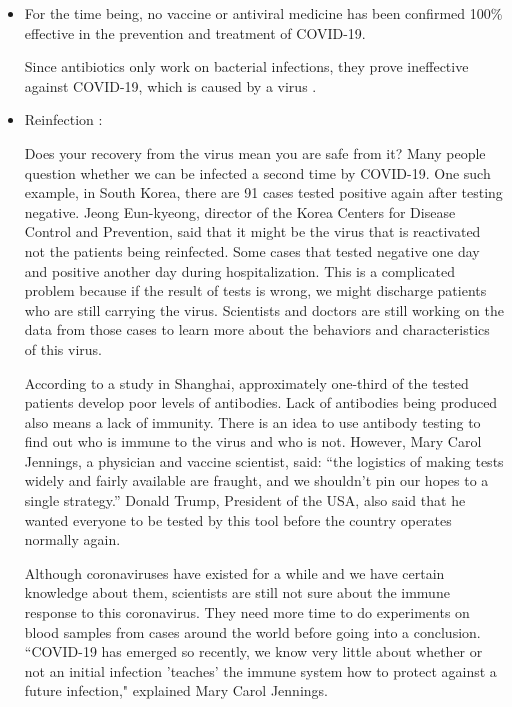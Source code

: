 \begin{itemize}
      \item For the time being, no vaccine or antiviral medicine has been confirmed 100\% effective in the prevention and treatment of COVID-19.
      \par Since antibiotics only work on bacterial infections, they prove ineffective against COVID-19, which is caused by a virus \parencite{Q&A_WHO}.
      \item Reinfection \parencite{Reinfection_abcnews} \parencite{Reinfection_independent}:
      \par Does your recovery from the virus mean you are safe from it? Many people question whether we can be infected a second time by COVID-19. One such example, in South Korea, there are 91 cases tested positive again after testing negative. Jeong Eun-kyeong, director of the Korea Centers for Disease Control and Prevention, said that it might be the virus that is reactivated not the patients being reinfected. Some cases that tested negative one day and positive another day during hospitalization. This is a complicated problem because if the result of tests is wrong, we might discharge patients who are still carrying the virus. Scientists and doctors are still working on the data from those cases to learn more about the behaviors and characteristics of this virus.
      \par According to a study in Shanghai, approximately one-third of the tested patients develop poor levels of antibodies. Lack of antibodies being produced also means a lack of immunity. There is an idea to use antibody testing to find out who is immune to the virus and who is not. However, Mary Carol Jennings, a physician and vaccine scientist, said: “the logistics of making tests widely and fairly available are fraught, and we shouldn't pin our hopes to a single strategy.” Donald Trump, President of the USA, also said that he wanted everyone to be tested by this tool before the country operates normally again.
      \par Although coronaviruses have existed for a while and we have certain knowledge about them, scientists are still not sure about the immune response to this coronavirus. They need more time to do experiments on blood samples from cases around the world before going into a conclusion. ``COVID-19 has emerged so recently, we know very little about whether or not an initial infection 'teaches' the immune system how to protect against a future infection," explained Mary Carol Jennings.
    \end{itemize}

